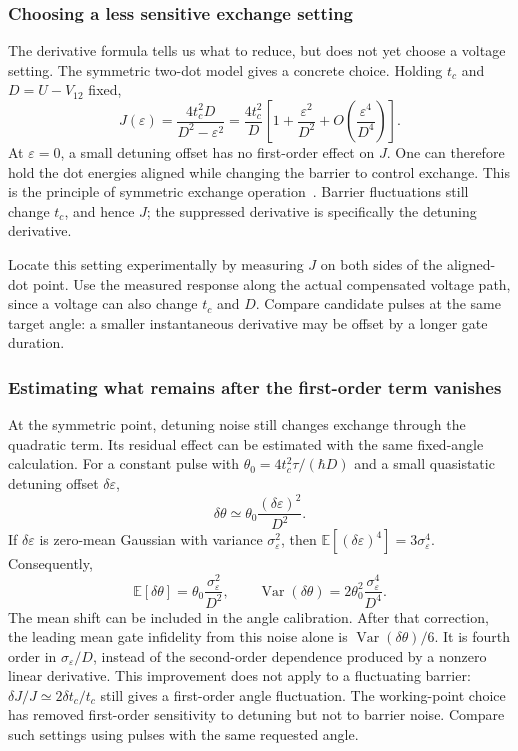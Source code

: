 \subsubsection{Choosing a less sensitive exchange setting}
The derivative formula tells us what to reduce, but does not yet
choose a voltage setting. The symmetric two-dot model gives a
concrete choice. Holding
$t_c$ and $D=U-V_{12}$ fixed,
\begin{equation}
 J(\varepsilon)=\frac{4t_c^2D}{D^2-\varepsilon^2}
 =\frac{4t_c^2}{D}
   \left[1+\frac{\varepsilon^2}{D^2}
           +O\!\left(\frac{\varepsilon^4}{D^4}\right)\right].
 \label{eq:calibration-symmetric-exchange}
\end{equation}
At $\varepsilon=0$, a small detuning offset has no first-order
effect on $J$. One can therefore hold the dot energies aligned
while changing the barrier to control exchange. This is the
principle of symmetric exchange operation~\cite{Reed2016}.
Barrier fluctuations still change $t_c$, and hence $J$; the
suppressed derivative is specifically the detuning derivative.

Locate this setting experimentally by measuring $J$ on both sides
of the aligned-dot point. Use the measured response along the
actual compensated voltage path, since a voltage can also change
$t_c$ and $D$. Compare candidate pulses at the same target angle:
a smaller instantaneous derivative may be offset by a longer
gate duration.

\subsubsection{Estimating what remains after the first-order term vanishes}
At the symmetric point, detuning noise still changes exchange
through the quadratic term. Its residual effect can be estimated
with the same fixed-angle calculation. For a constant pulse with
$\theta_0=4t_c^2\tau/(\hbar D)$ and a small quasistatic detuning
offset $\delta\varepsilon$,
\[
 \delta\theta\simeq\theta_0\frac{(\delta\varepsilon)^2}{D^2}.
\]
If $\delta\varepsilon$ is zero-mean Gaussian with variance
$\sigma_\varepsilon^2$, then
$\mathbb E[(\delta\varepsilon)^4]=3\sigma_\varepsilon^4$.
Consequently,
\begin{equation}
 \mathbb E[\delta\theta]=
       \theta_0\frac{\sigma_\varepsilon^2}{D^2},\qquad
 \operatorname{Var}(\delta\theta)=
       2\theta_0^2\frac{\sigma_\varepsilon^4}{D^4}.
 \label{eq:calibration-quadratic-detuning-noise}
\end{equation}
The mean shift can be included in the angle calibration.
After that correction, the leading mean gate infidelity from
this noise alone is $\operatorname{Var}(\delta\theta)/6$.
It is fourth order in $\sigma_\varepsilon/D$, instead of the
second-order dependence produced by a nonzero linear derivative.
This improvement does not apply to a fluctuating barrier:
$\delta J/J\simeq2\delta t_c/t_c$ still gives a first-order
angle fluctuation. The working-point choice has removed first-order sensitivity to
detuning but not to barrier noise. Compare such settings using
pulses with the same requested angle.

